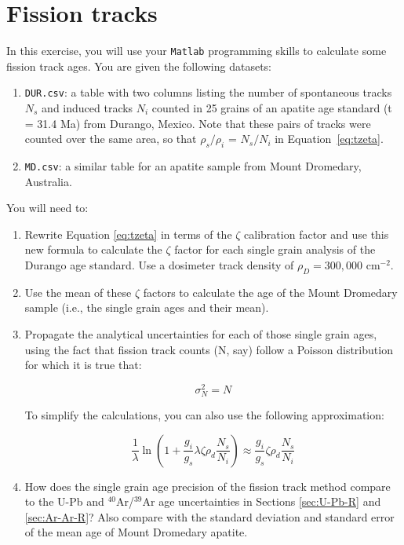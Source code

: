 \documentclass{book}
\begin{document}
\section{Fission tracks}

In this exercise, you will use your {\tt Matlab} programming skills to
calculate some fission track ages. You are given the following
datasets:

\begin{enumerate}
\item {\tt DUR.csv}: a table with two columns listing the number of
  spontaneous tracks $N_s$ and induced tracks $N_i$ counted in 25
  grains of an apatite age standard (t = 31.4 Ma) from Durango,
  Mexico.  Note that these pairs of tracks were counted over the same
  area, so that $\rho_s/\rho_i$ = $N_s/N_i$ in Equation~\ref{eq:tzeta}.
\item{\tt MD.csv}: a similar table for an apatite sample from Mount
  Dromedary, Australia.
\end{enumerate}

You will need to:

\begin{enumerate} 

\item Rewrite Equation \ref{eq:tzeta} in terms of the $\zeta$
  calibration factor and use this new formula to calculate the $\zeta$
  factor for each single grain analysis of the Durango age standard.
  Use a dosimeter track density of $\rho_D = 300,000$ cm$^{-2}$.
\item Use the mean of these $\zeta$ factors to calculate the age of
  the Mount Dromedary sample (i.e., the single grain ages and their
  mean).
\item Propagate the analytical uncertainties for each of those single
  grain ages, using the fact that fission track counts (N, say) follow
  a Poisson distribution for which it is true that:

$$\sigma^2_N = N$$

To simplify the calculations, you can also use the following
approximation:

$$\frac{1}{\lambda}\ln\left(1+\frac{g_i}{g_s}\lambda\zeta\rho_d\frac{N_s}{N_i}\right)
\approx \frac{g_i}{g_s}\zeta\rho_d\frac{N_s}{N_i}$$

\item How does the single grain age precision of the fission track
  method compare to the U-Pb and $^{40}$Ar/$^{39}$Ar age uncertainties
  in Sections \ref{sec:U-Pb-R} and \ref{sec:Ar-Ar-R}? Also compare
  with the standard deviation and standard error of the mean age of
  Mount Dromedary apatite.

\end{enumerate}

\end{document}
